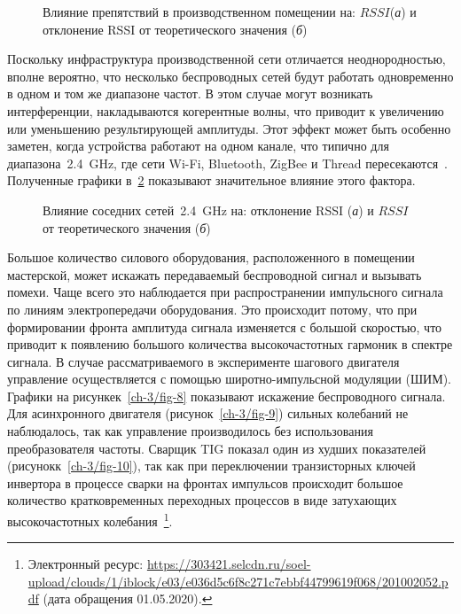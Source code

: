 \begin{figure} [tb]
	\caption{Влияние препятствий в производственном помещении на: $RSSI$(\textit{а}) и отклонение RSSI от теоретического значения (\textit{б})}
	\label{ch-3/fig-6}
\end{figure}

Поскольку инфраструктура производственной сети отличается неоднородностью, вполне вероятно, что несколько беспроводных сетей будут работать одновременно в одном и том же диапазоне частот. В этом случае могут возникать интерференции, накладываются когерентные волны, что приводит к увеличению или уменьшению результирующей амплитуды. Этот эффект может быть особенно заметен, когда устройства работают на одном канале, что типично для диапазона~\SI{2,4}{\giga \hertz}, где сети Wi-Fi, Bluetooth, ZigBee и Thread пересекаются~\cite{016461}. Полученные графики в~\cref{ch-3/fig-7} показывают значительное влияние этого фактора.

\begin{figure} [htb]
	\caption{Влияние соседних сетей~\SI{2,4}{\giga \hertz} на: отклонение RSSI (\textit{а}) и $RSSI$ от теоретического значения (\textit{б})}
	\label{ch-3/fig-7}
\end{figure}

Большое количество силового оборудования, расположенного в помещении мастерской, может искажать передаваемый беспроводной сигнал и вызывать помехи. Чаще всего это наблюдается при распространении импульсного сигнала по линиям электропередачи оборудования. Это происходит потому, что при формировании фронта амплитуда сигнала изменяется с большой скоростью, что приводит к появлению большого количества высокочастотных гармоник в спектре сигнала. В случае рассматриваемого в эксперименте шагового двигателя управление осуществляется с помощью широтно-импульсной модуляции (ШИМ). Графики на рисункек~\cref{ch-3/fig-8} показывают искажение беспроводного сигнала. Для асинхронного двигателя (рисунок~\cref{ch-3/fig-9}) сильных колебаний не наблюдалось, так как управление производилось без использования преобразователя частоты. Сварщик TIG показал один из худших показателей (рисунокк~\cref{ch-3/fig-10}), так как при переключении транзисторных ключей инвертора в процессе сварки на фронтах импульсов происходит большое количество кратковременных переходных процессов в виде затухающих высокочастотных колебания~\footnote{Электронный ресурс: {\tiny\url{https://303421.selcdn.ru/soel-upload/clouds/1/iblock/e03/e036d5c6f8c271c7ebbf44799619f068/201002052.pdf}} (дата обращения 01.05.2020).}.

